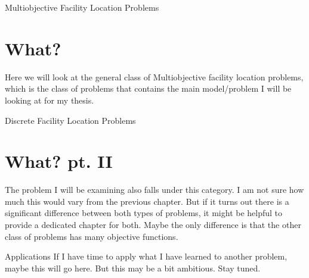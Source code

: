 \documentclass[12pt]{pom_thesis}
\begin{document}
\begin{chapter}{Multiobjective Facility Location Problems}
\section{What?}
Here we will look at the general class of Multiobjective facility location problems, which is the class of problems that contains the main model/problem I will be looking at for my thesis. 
\end{chapter}

\begin{chapter}{Discrete Facility Location Problems}
\section{What? pt. II}
The problem I will be examining also falls under this category. I am not sure how much this would vary from the previous chapter. But if it turns out there is a significant difference between both types of problems, it might be helpful to provide a dedicated chapter for both. Maybe the only difference is that the other class of problems has many objective functions.
\end{chapter}

\begin{chapter}{Applications}
If I have time to apply what I have learned to another problem, maybe this will go here. But this may be a bit ambitious. Stay tuned.
\end{chapter}
\end{document}
